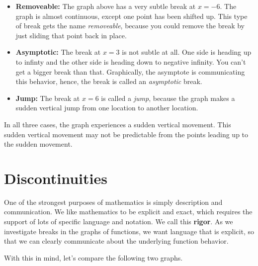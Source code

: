 \documentclass{ximera}
\begin{document}
\begin{itemize}
\item \textbf{\textcolor{blue!75!black}{Removeable:}}  The graph above has a very subtle break at $x=-6$. The graph is almost continuous, except one point has been shifted up. This type of break gets the name \textit{removeable}, because you could remove the break by just sliding that point back in place. \\

\item \textbf{\textcolor{blue!75!black}{Asymptotic:}} The break at $x=3$ is not subtle at all.  One side is heading up to infinty and the other side is heading down to negative infinity.  You can't get a bigger break than that. Graphically, the asymptote is communicating this behavior, hence, the break is called an \textit{asymptotic} break. \\

\item \textbf{\textcolor{blue!75!black}{Jump:}} The break at $x=6$ is called a \textit{jump}, because the graph makes a sudden vertical jump from one location to another location.
\end{itemize}


In all three cases, the graph experiences a sudden vertical movement.  This sudden vertical movement may not be predictable from the points leading up to the sudden movement.








\section{Discontinuities}
One of the strongest purposes of mathematics is simply description and communication.  We like mathematics to be explicit and exact, which requires the support of lots of specific language and notation. We call this \textbf{\textcolor{purple!85!blue}{rigor}}. As we investigate breaks in the graphs of functions, we want language that is explicit, so that we can clearly communicate about the underlying function behavior.

With this in mind, let's compare the following two graphs.
\end{document}
